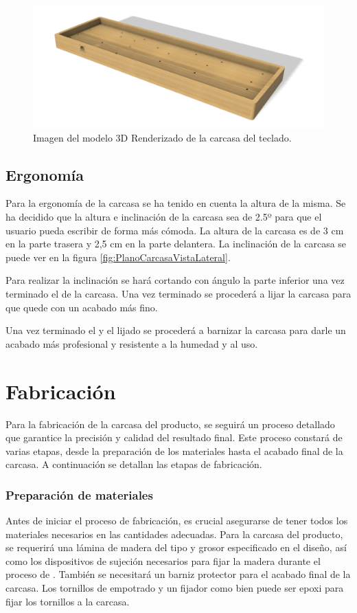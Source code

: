 \begin{figure}[H]
    \centering
    \includegraphics[width=1\textwidth]{imagenes/Capitulos/Cap06/Modelo3DRender.png}
    \caption{Imagen del modelo 3D Renderizado de la carcasa del teclado.}
    \label{fig:Modelo3DRender}
\end{figure}

\subsection{Ergonomía}
Para la ergonomía de la carcasa se ha tenido en cuenta la altura de la misma. Se ha decidido que la altura e inclinación de la carcasa sea de 2.5º para que el usuario pueda escribir de forma más cómoda. La altura de la carcasa es de 3 cm en la parte trasera y 2,5 cm en la parte delantera. La inclinación de la carcasa se puede ver en la figura \ref{fig:PlanoCarcasaVistaLateral}.

Para realizar la inclinación se hará cortando con ángulo la parte inferior una vez terminado el  de la carcasa. Una vez terminado se procederá a lijar la carcasa para que quede con un acabado más fino.

Una vez terminado el  y el lijado se procederá a barnizar la carcasa para darle un acabado más profesional y resistente a la humedad y al uso.

\section{Fabricación}
Para la fabricación de la carcasa del producto, se seguirá un proceso detallado que garantice la precisión y calidad del resultado final. Este proceso constará de varias etapas, desde la preparación de los materiales hasta el acabado final de la carcasa. A continuación se detallan las etapas de fabricación.

\subsubsection{Preparación de materiales}
Antes de iniciar el proceso de fabricación, es crucial asegurarse de tener todos los materiales necesarios en las cantidades adecuadas. Para la carcasa del producto, se requerirá una lámina de madera del tipo y grosor especificado en el diseño, así como los dispositivos de sujeción necesarios para fijar la madera durante el proceso de . También se necesitará un barniz protector para el acabado final de la carcasa. Los tornillos de empotrado y un fijador como bien puede ser epoxi para fijar los tornillos a la carcasa.

